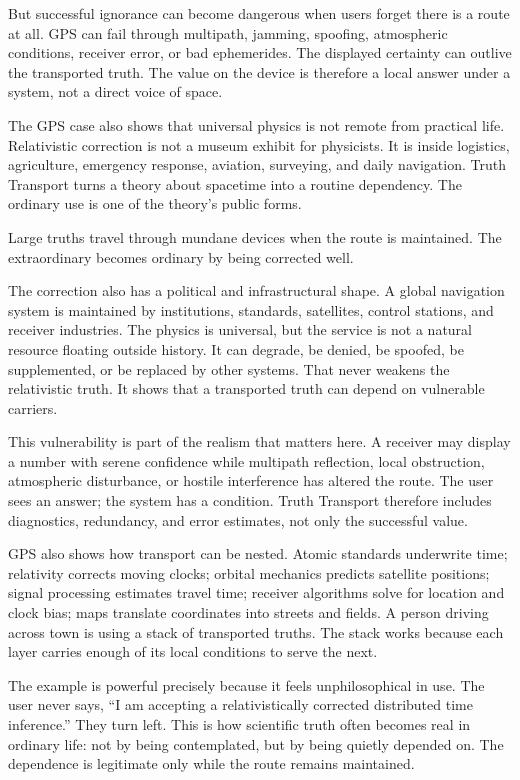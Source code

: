 But successful ignorance can become dangerous when users forget there is
a route at all. GPS can fail through multipath, jamming, spoofing,
atmospheric conditions, receiver error, or bad ephemerides. The
displayed certainty can outlive the transported truth. The value on the
device is therefore a local answer under a system, not a direct voice of
space.

The GPS case also shows that universal physics is not remote from
practical life. Relativistic correction is not a museum exhibit for
physicists. It is inside logistics, agriculture, emergency response,
aviation, surveying, and daily navigation. Truth Transport turns a
theory about spacetime into a routine dependency. The ordinary use is
one of the theory's public forms.

Large truths travel through mundane devices when the route is
maintained. The extraordinary becomes ordinary by being corrected well.

The correction also has a political and infrastructural shape. A global
navigation system is maintained by institutions, standards, satellites,
control stations, and receiver industries. The physics is universal, but
the service is not a natural resource floating outside history. It can
degrade, be denied, be spoofed, be supplemented, or be replaced by other
systems. That never weakens the relativistic truth. It shows that a
transported truth can depend on vulnerable carriers.

This vulnerability is part of the realism that matters here. A receiver
may display a number with serene confidence while multipath reflection,
local obstruction, atmospheric disturbance, or hostile interference has
altered the route. The user sees an answer; the system has a condition.
Truth Transport therefore includes diagnostics, redundancy, and error
estimates, not only the successful value.

GPS also shows how transport can be nested. Atomic standards underwrite
time; relativity corrects moving clocks; orbital mechanics predicts
satellite positions; signal processing estimates travel time; receiver
algorithms solve for location and clock bias; maps translate coordinates
into streets and fields. A person driving across town is using a stack
of transported truths. The stack works because each layer carries enough
of its local conditions to serve the next.

The example is powerful precisely because it feels unphilosophical in
use. The user never says, ``I am accepting a relativistically corrected
distributed time inference.'' They turn left. This is how scientific
truth often becomes real in ordinary life: not by being contemplated,
but by being quietly depended on. The dependence is legitimate only
while the route remains maintained.


